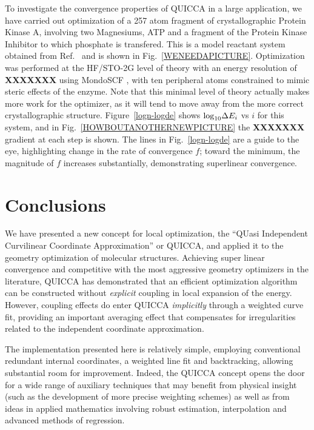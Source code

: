 \documentclass[prl,twocolumn,showpacs,twocolumngrid,superbib]{revtex4}
\begin{document}
To investigate the convergence properties of QUICCA in a large application, we have carried out
optimization of a 257 atom fragment of crystallographic Protein Kinase A, involving two Magnesiums, 
ATP and a fragment of the Protein Kinase Inhibitor to which phosphate is transfered. This is a
model reactant system obtained from Ref.~ and is shown in 
Fig.~\ref{WENEEDAPICTURE}.   Optimization was performed at the HF/STO-2G level of theory with an 
energy resolution of {\bf XXXXXXX} using MondoSCF \cite{MondoSCF}, with ten peripheral atoms 
constrained to mimic steric effects of the enzyme.  Note that this minimal level of theory actually 
makes more work for the optimizer, as it will tend to move away from the more correct crystallographic 
structure.  Figure~\ref{logn-logde} shows ${\rm log}_{10} \Delta E_i$ vs $i$ for this system, and in 
Fig.~\ref{HOWBOUTANOTHERNEWPICTURE} the {\bf XXXXXXX} gradient at each step is shown.   
The lines in Fig.~\ref{logn-logde} are a guide to the eye, highlighting change in the rate of 
convergence $f$;  toward the minimum, the magnitude of $f$ increases substantially, demonstrating  
superlinear convergence.  

\section{Conclusions}

We have presented a new concept for local optimization, the ``QUasi Independent Curvilinear 
Coordinate Approximation'' or  QUICCA, and applied it to the geometry optimization of molecular 
structures. Achieving super linear convergence and competitive with the most aggressive geometry 
optimizers in the literature, QUICCA has demonstrated that an efficient optimization algorithm 
can be constructed without {\em explicit} coupling in local expansion of the energy.  
However, coupling effects do enter QUICCA {\em implicitly} through a weighted curve fit, 
providing an important averaging effect that compensates for irregularities related
to the independent coordinate approximation.  

The implementation presented here is relatively simple, employing conventional redundant
internal coordinates, a weighted line fit and backtracking, allowing  substantial room for 
improvement.  Indeed, the QUICCA concept opens the door for a wide range of auxiliary techniques 
that may benefit from physical insight (such as the development of more precise weighting schemes) 
as well as from ideas in applied mathematics involving robust estimation, interpolation and 
advanced methods of regression.  
\end{document}
